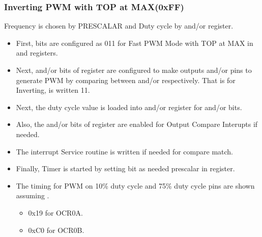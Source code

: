 \subsubsection{Inverting PWM with TOP at MAX(0xFF)}
\quad Frequency is chosen by PRESCALAR and Duty cycle by  and/or  register.
\begin{itemize}
    \item First,  bits are configured as 011 for Fast PWM Mode with TOP at MAX in  and  registers.
    \item Next,  and/or  bits of  register are configured to make outputs  and/or  pins to generate PWM by comparing between  and/or  respectively. That is for Inverting,  is written 11.
    \item Next, the duty cycle value is loaded into  and/or  register for  and/or  bits.
    \item Also, the  and/or  bits of  register  are enabled for Output Compare Interupts if needed.
    \item The interrupt Service routine is written if needed for compare match.
    \item Finally, Timer is started by setting  bit as needed prescalar in  register.
    \item The timing for PWM on 10\% duty cycle  and 75\% duty cycle  pins are shown assuming .
    \begin{itemize}
        \item 0x19 for OCR0A.
        \item 0xC0 for OCR0B.
    \end{itemize}
\end{itemize}

